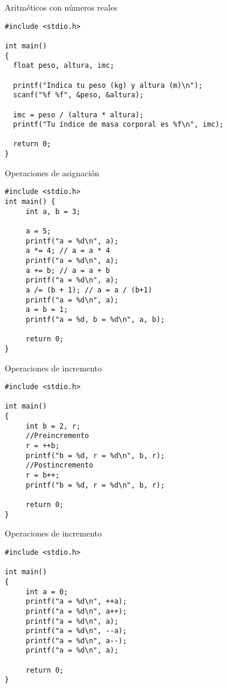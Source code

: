 \documentclass[xcolor={usenames,svgnames,dvipsnames}, aspectratio=169]{beamer}
\begin{document}
\begin{frame}[label={sec:orgc8b69ec},fragile]{Aritméticos con números reales}
 \lstset{language=C,label= ,caption= ,captionpos=b,numbers=none}
\begin{lstlisting}
#include <stdio.h>

int main()
{
  float peso, altura, imc;

  printf("Indica tu peso (kg) y altura (m)\n");
  scanf("%f %f", &peso, &altura);

  imc = peso / (altura * altura);
  printf("Tu índice de masa corporal es %f\n", imc);

  return 0;
}
\end{lstlisting}
\end{frame}
\begin{frame}[label={sec:orgaf3d6ba},fragile,plain]{Operaciones de asignación}
 \lstset{language=C,label= ,caption= ,captionpos=b,numbers=none}
\begin{lstlisting}
#include <stdio.h>
int main() { 
     int a, b = 3; 

     a = 5; 
     printf("a = %d\n", a); 
     a *= 4; // a = a * 4
     printf("a = %d\n", a); 
     a += b; // a = a + b
     printf("a = %d\n", a); 
     a /= (b + 1); // a = a / (b+1)
     printf("a = %d\n", a); 
     a = b = 1; 
     printf("a = %d, b = %d\n", a, b);

     return 0;
} 
\end{lstlisting}
\end{frame}

\begin{frame}[label={sec:org3cdce06},fragile]{Operaciones de incremento}
 \lstset{language=C,label= ,caption= ,captionpos=b,numbers=none}
\begin{lstlisting}
#include <stdio.h>

int main() 
{ 
     int b = 2, r; 
     //Preincremento
     r = ++b; 
     printf("b = %d, r = %d\n", b, r); 
     //Postincremento
     r = b++; 
     printf("b = %d, r = %d\n", b, r); 
     
     return 0; 
}
\end{lstlisting}
\end{frame}

\begin{frame}[label={sec:orgd836648},fragile]{Operaciones de incremento}
 \lstset{language=C,label= ,caption= ,captionpos=b,numbers=none}
\begin{lstlisting}
#include <stdio.h>

int main() 
{ 
     int a = 0;
     printf("a = %d\n", ++a); 
     printf("a = %d\n", a++);
     printf("a = %d\n", a);
     printf("a = %d\n", --a); 
     printf("a = %d\n", a--);     
     printf("a = %d\n", a);     

     return 0;
}
\end{lstlisting}
\end{frame}
\end{document}
